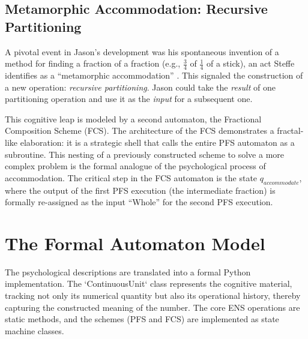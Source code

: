 \documentclass[12pt]{book}
\begin{document}
\subsection{Metamorphic Accommodation: Recursive Partitioning}
A pivotal event in Jason's development was his spontaneous invention of a method for finding a fraction of a fraction (e.g., $\frac{3}{4}$ of $\frac{1}{4}$ of a stick), an act Steffe identifies as a ``metamorphic accommodation'' \parencite {steffe2003construction}. This signaled the construction of a new operation: \textit{recursive partitioning}. Jason could take the \textit{result} of one partitioning operation and use it as the \textit{input} for a subsequent one.

This cognitive leap is modeled by a second automaton, the Fractional Composition Scheme (FCS). The architecture of the FCS demonstrates a fractal-like elaboration: it is a strategic shell that calls the entire PFS automaton as a subroutine. This nesting of a previously constructed scheme to solve a more complex problem is the formal analogue of the psychological process of accommodation. The critical step in the FCS automaton is the state $q_{accommodate}$, where the output of the first PFS execution (the intermediate fraction) is formally re-assigned as the input ``Whole'' for the second PFS execution.

\section{The Formal Automaton Model}

The psychological descriptions are translated into a formal Python implementation. The `ContinuousUnit` class represents the cognitive material, tracking not only its numerical quantity but also its operational history, thereby capturing the constructed meaning of the number. The core ENS operations are static methods, and the schemes (PFS and FCS) are implemented as state machine classes.
\end{document}
